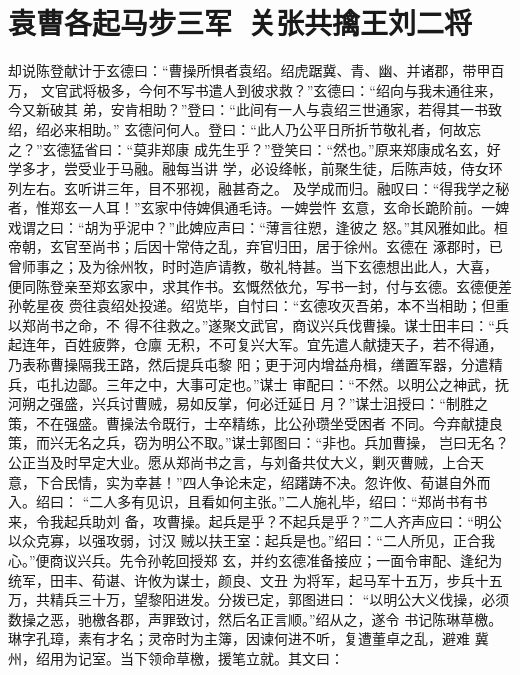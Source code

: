 \chapter{袁曹各起马步三军~关张共擒王刘二将}

却说陈登献计于玄德曰：“曹操所惧者袁绍。绍虎踞冀、青、幽、并诸郡，带甲百万，
文官武将极多，今何不写书遣人到彼求救？”玄德曰：“绍向与我未通往来，今又新破其
弟，安肯相助？”登曰：“此间有一人与袁绍三世通家，若得其一书致绍，绍必来相助。”
玄德问何人。登曰：“此人乃公平日所折节敬礼者，何故忘之？”玄德猛省曰：“莫非郑康
成先生乎？”登笑曰：“然也。”原来郑康成名玄，好学多才，尝受业于马融。融每当讲
学，必设绛帐，前聚生徒，后陈声妓，侍女环列左右。玄听讲三年，目不邪视，融甚奇之。
及学成而归。融叹曰：“得我学之秘者，惟郑玄一人耳！”玄家中侍婢俱通毛诗。一婢尝忤
玄意，玄命长跪阶前。一婢戏谓之曰：“胡为乎泥中？”此婢应声曰：“薄言往愬，逢彼之
怒。”其风雅如此。桓帝朝，玄官至尚书；后因十常侍之乱，弃官归田，居于徐州。玄德在
涿郡时，已曾师事之；及为徐州牧，时时造庐请教，敬礼特甚。当下玄德想出此人，大喜，
便同陈登亲至郑玄家中，求其作书。玄慨然依允，写书一封，付与玄德。玄德便差孙乾星夜
赍往袁绍处投递。绍览毕，自忖曰：“玄德攻灭吾弟，本不当相助；但重以郑尚书之命，不
得不往救之。”遂聚文武官，商议兴兵伐曹操。谋士田丰曰：“兵起连年，百姓疲弊，仓廪
无积，不可复兴大军。宜先遣人献捷天子，若不得通，乃表称曹操隔我王路，然后提兵屯黎
阳；更于河内增益舟楫，缮置军器，分遣精兵，屯扎边鄙。三年之中，大事可定也。”谋士
审配曰：“不然。以明公之神武，抚河朔之强盛，兴兵讨曹贼，易如反掌，何必迁延日
月？”谋士沮授曰：“制胜之策，不在强盛。曹操法令既行，士卒精练，比公孙瓒坐受困者
不同。今弃献捷良策，而兴无名之兵，窃为明公不取。”谋士郭图曰：“非也。兵加曹操，
岂曰无名？公正当及时早定大业。愿从郑尚书之言，与刘备共仗大义，剿灭曹贼，上合天
意，下合民情，实为幸甚！”四人争论未定，绍躇踌不决。忽许攸、荀谌自外而入。绍曰：
“二人多有见识，且看如何主张。”二人施礼毕，绍曰：“郑尚书有书来，令我起兵助刘
备，攻曹操。起兵是乎？不起兵是乎？”二人齐声应曰：“明公以众克寡，以强攻弱，讨汉
贼以扶王室：起兵是也。”绍曰：“二人所见，正合我心。”便商议兴兵。先令孙乾回授郑
玄，并约玄德准备接应；一面令审配、逢纪为统军，田丰、荀谌、许攸为谋士，颜良、文丑
为将军，起马军十五万，步兵十五万，共精兵三十万，望黎阳进发。分拨已定，郭图进曰：
“以明公大义伐操，必须数操之恶，驰檄各郡，声罪致讨，然后名正言顺。”绍从之，遂令
书记陈琳草檄。琳字孔璋，素有才名；灵帝时为主簿，因谏何进不听，复遭董卓之乱，避难
冀州，绍用为记室。当下领命草檄，援笔立就。其文曰：

